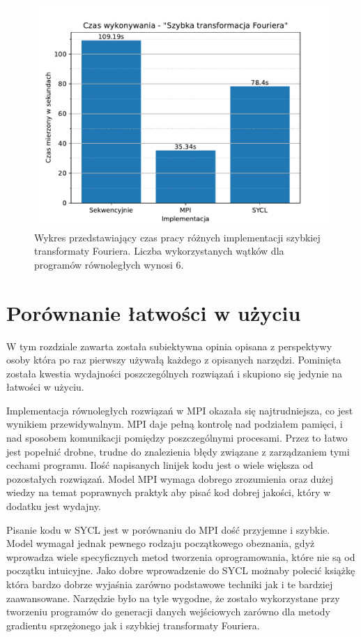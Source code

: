 \documentclass[a4paper,12pt]{book} %
\begin{document}
\begin{figure}
	\centering
	\includegraphics[scale=0.8]{assets/czas_wykonania_fft.pdf}
	\caption{Wykres przedstawiający czas pracy różnych implementacji szybkiej transformaty Fouriera. Liczba wykorzystanych wątków dla programów równoległych wynosi 6.}
	\label{fig:wykonanie-fft}
\end{figure}

\chapter{Porównanie łatwości w użyciu}
W tym rozdziale zawarta została subiektywna opinia opisana z perspektywy osoby która po raz pierwszy używałą każdego z opisanych narzędzi. Pominięta została kwestia wydajności poszczególnych rozwiązań i skupiono się jedynie na łatwości w użyciu.

Implementacja równoległych rozwiązań w MPI okazała się najtrudniejsza, co jest wynikiem przewidywalnym. MPI daje pełną kontrolę nad podziałem pamięci, i nad sposobem komunikacji pomiędzy poszczególnymi procesami. Przez to łatwo jest popełnić drobne, trudne do znalezienia błędy związane z zarządzaniem tymi cechami programu. Ilość napisanych linijek kodu jest o wiele większa od pozostałych rozwiązań. Model MPI wymaga dobrego zrozumienia oraz dużej wiedzy na temat poprawnych praktyk aby pisać kod dobrej jakości, który w dodatku jest wydajny.

Pisanie kodu w SYCL jest w porównaniu do MPI dość przyjemne i szybkie. Model wymagał jednak pewnego rodzaju początkowego obeznania, gdyż wprowadza wiele specyficznych metod tworzenia oprogramowania, które nie są od początku intuicyjne. Jako dobre wprowadzenie do SYCL możnaby polecić książkę \cite{sycl-book} która bardzo dobrze wyjaśnia zarówno podstawowe techniki jak i te bardziej zaawansowane. Narzędzie było na tyle wygodne, że zostało wykorzystane przy tworzeniu programów do generacji danych wejściowych zarówno dla metody gradientu sprzężonego jak i szybkiej transformaty Fouriera.
\end{document}
